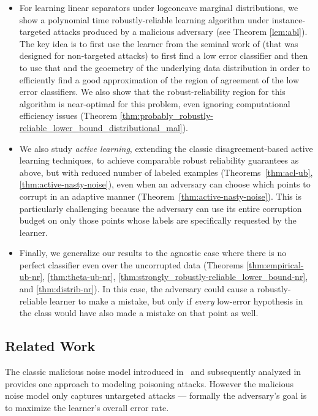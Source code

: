 \documentclass[11pt]{article}
\newcommand{\0}{\mathbf{0}}
\newcommand{\1}{\mathbf{1}}
\begin{document}
\begin{itemize}[leftmargin=*]
\item For learning linear separators under logconcave marginal  distributions, we show a polynomial time robustly-reliable learning algorithm  under  instance-targeted attacks produced by  a malicious adversary \citep{valiant1985learning} (see Theorem \ref{lem:abl}). The key idea is to first use the learner from the seminal work of \cite{awasthi2017power} 
(that was designed for non-targeted attacks) to first find a low error classifier and then to use that and the geoemetry of the underlying data distribution in order to efficiently find a good approximation of the region of agreement of the low error classifiers.
We also show that the robust-reliability region for this algorithm is near-optimal for this problem, even ignoring  computational efficiency issues (Theorem \ref{thm:probably_robustly-reliable_lower_bound_distributional_mal}).


\item We also study {\em active learning}, extending the classic
disagreement-based active learning techniques, to achieve comparable robust reliability guarantees as above, but with reduced number of labeled examples (Theorems~\ref{thm:acl-ub}, \ref{thm:active-nasty-noise}), even when an adversary can choose which points to corrupt in an adaptive manner (Theorem~\ref{thm:active-nasty-noise}).
This is particularly challenging because the adversary can use its entire corruption budget on only those points whose labels are specifically requested by the learner.

\item Finally, we generalize our results to the agnostic case where there is no perfect classifier even over the uncorrupted data (Theorems \ref{thm:empirical-ub-nr}, \ref{thm:theta-ub-nr}, \ref{thm:strongly_robustly-reliable_lower_bound-nr}, and \ref{thm:distrib-nr}). In this case, the adversary could cause a robustly-reliable learner to make a mistake, but only if {\em every} low-error hypothesis in the class would have also made a mistake on that point as well.
\end{itemize}

\subsection*{Related Work}
 The classic malicious noise model introduced in~\citep{valiant1985learning} and subsequently analyzed in \citep{kearns1993learning,bshouty2002pac,klivans2009learning,awasthi2017power}
provides one approach to modeling poisoning attacks. However the malicious noise model only captures untargeted attacks --- formally the adversary's goal is to maximize the learner's overall error rate. 
\end{document}
